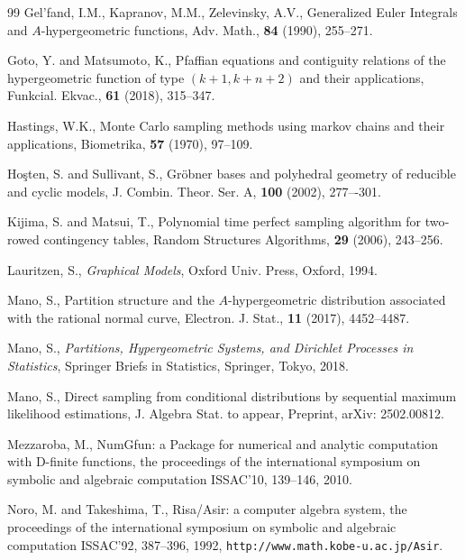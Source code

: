 \documentclass[a4paper,12pt]{article}
\theoremstyle{plain}
\theoremstyle{remark}
\begin{document}
\begin{thebibliography}{99}
Gel'fand, I.M., Kapranov, M.M., Zelevinsky, A.V.,
Generalized Euler Integrals and $A$-hypergeometric functions,
Adv. Math.,
\textbf{84} (1990), 255--271.

Goto, Y. and Matsumoto, K.,
Pfaffian equations and contiguity relations of the hypergeometric
function of type $(k+1,k+n+2)$ and their applications,
Funkcial. Ekvac.,
\textbf{61} (2018), 315--347.

Hastings, W.K.,
Monte Carlo sampling methods using markov chains and their applications,
Biometrika, \textbf{57} (1970), 97--109. 

Ho\c{s}ten, S. and Sullivant, S.,
Gr\"obner bases and polyhedral geometry of reducible and cyclic models,
J. Combin. Theor. Ser. A,
\textbf{100} (2002), 277–-301.


Kijima, S. and Matsui, T.,
Polynomial time perfect sampling algorithm for two‐rowed contingency
tables,
Random Structures Algorithms,
\textbf{29} (2006), 243--256.

Lauritzen, S.,
\textit{Graphical Models},
Oxford Univ. Press, Oxford, 1994.


Mano, S.,
Partition structure and the $A$-hypergeometric distribution associated
with the rational normal curve,
Electron. J. Stat.,
\textbf{11} (2017), 4452--4487.

Mano, S.,
\textit{Partitions, Hypergeometric Systems, and Dirichlet Processes
  in Statistics},
Springer Briefs in Statistics, Springer, Tokyo, 2018.

Mano, S.,
Direct sampling from conditional distributions by sequential maximum
likelihood estimations,
J. Algebra Stat. to appear,
Preprint, arXiv: 2502.00812.

Mezzaroba, M.,
NumGfun: a Package for numerical and analytic computation with
D-finite functions,
the proceedings of the international symposium on symbolic and
algebraic computation ISSAC'10, 139--146, 2010.

Noro, M. and Takeshima, T.,
Risa/Asir: a computer algebra system,
the proceedings of the international symposium on symbolic and
algebraic computation ISSAC'92, 387--396, 1992,
{\tt http://www.math.kobe-u.ac.jp/Asir}.


\end{thebibliography}
\end{document}
